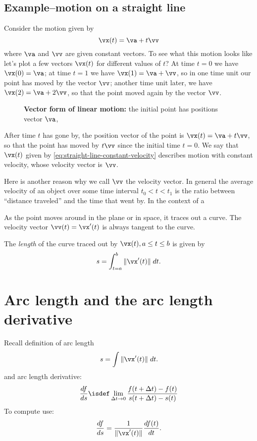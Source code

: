 \subsection{Example--motion on a straight line} %
Consider the motion given by
\begin{equation}
  \vx(t) = \va + t\vv
  \label{eq:straight-line-constant-velocity}
\end{equation}
where $\va $ and $\vv$ are given constant vectors.  To see what this
motion looks like let's plot a few vectors $\vx(t)$ for different
values of $t$?  At time $t=0$ we have $\vx(0) = \va$; at time $t=1$ we
have $\vx(1) = \va+\vv$, so in one time unit our point has moved by
the vector $\vv$; another time unit later, we have $\vx(2) =
\va+2\vv$, so that the point moved again by the vector $\vv$.
\begin{figure}[h]
  \centering
  
  \caption{\textbf{Vector form of linear motion: } the initial point
    has positions vector $\va$, }
  \label{fig:vector-form-linear-motion}
\end{figure}
After time $t$ has gone by, the position vector of the point is
$\vx(t) = \va+t\vv$, so that the point has moved by $t\vv$ since the
initial time $t=0$.  We say that $\vx(t)$ given by
\eqref{eq:straight-line-constant-velocity} describes motion with
constant velocity, whose velocity vector is $\vv$.

Here is another reason why we call $\vv$ the velocity vector.  In
general the average velocity of an object over some time interval
$t_0<t<t_1$ is the ratio between ``distance traveled'' and the time
that went by.  In the context of a 

As the point moves around in the plane or in space, it traces out a
curve.  The velocity vector $\vv(t) = \vx'(t)$ is always tangent to
the curve.

The \emph{length} of the curve traced out by $\vx(t), a\le t\le b$ is
given by
\[
s = \int_{t=a}^b \|\vx'(t)\|\; dt.
\]


\section{Arc length and the arc length derivative} %
Recall definition of arc length
\begin{equation}
  \label{eq:arclength-def}
  s = \int \|\vx'(t)\|\; dt.
\end{equation}
and arc length derivative:
\begin{equation}
  \frac{df}{ds} \isdef
  \lim_{\Delta t\to 0} 
  \frac{f(t+\Delta t) - f(t)}{s(t+\Delta t) - s(t)}
  \label{eq:arc-length-deriv-def}
\end{equation}
To compute use:
\begin{equation}
  \frac{df}{ds} = \frac{1}{\|\vx'(t)\|} \frac{df(t)}{dt}.
  \label{eq:arclenght-deriv}
\end{equation}
